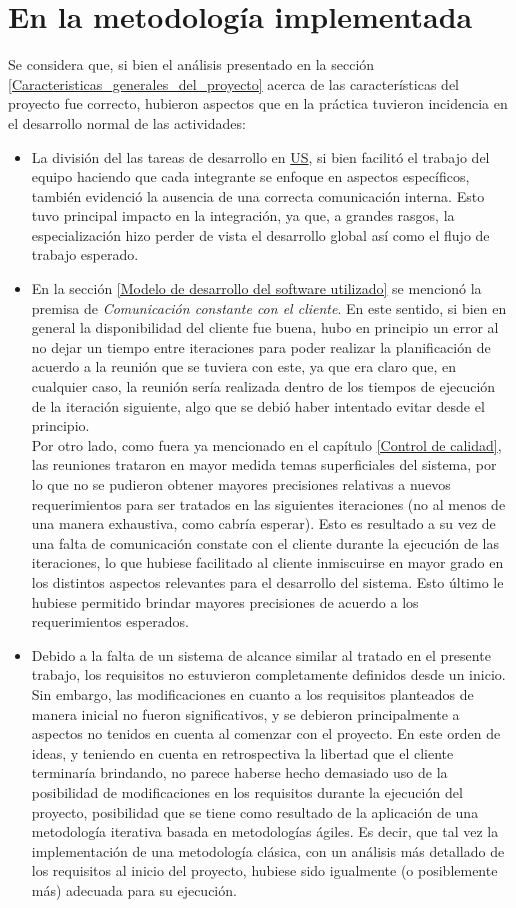 \documentclass[a4paper, 12pt,twoside]{report}  %
\numberwithin{equation}{subsection} %
\begin{document}
\section{En la metodología implementada}
\label{comparacion_metodologia_implementada}
Se considera que, si bien el análisis presentado en la sección \ref{Caracteristicas_generales_del_proyecto} acerca de las características del proyecto fue correcto, hubieron aspectos que en la práctica tuvieron incidencia en el desarrollo normal de las actividades:
\begin{itemize}
	\item La división del las tareas de desarrollo en \hyperlink{US}{US}, si bien facilitó el trabajo del equipo haciendo que cada integrante se enfoque en aspectos específicos, también evidenció la ausencia de una correcta comunicación interna. Esto tuvo principal impacto en la integración, ya que, a grandes rasgos, la especialización hizo perder de vista el desarrollo global así como el flujo de trabajo esperado.
	\item En la sección \ref{Modelo de desarrollo del software utilizado} se mencionó la premisa de \textit{Comunicación constante con el cliente}. En este sentido, si bien en general la disponibilidad del cliente fue buena, hubo en principio un error al no dejar un tiempo entre iteraciones para poder realizar la planificación de acuerdo a la reunión que se tuviera con este, ya que era claro que, en cualquier caso, la reunión sería realizada dentro de los tiempos de ejecución de la iteración siguiente, algo que se debió haber intentado evitar desde el principio.\\
	Por otro lado, como fuera ya mencionado en el capítulo \ref{Control de calidad}, las reuniones trataron en mayor medida temas superficiales del sistema, por lo que no se pudieron obtener mayores precisiones relativas a nuevos requerimientos para ser tratados en las siguientes iteraciones (no al menos de una manera exhaustiva, como cabría esperar). Esto es resultado a su vez de una falta de comunicación constate con el cliente durante la ejecución de las iteraciones, lo que hubiese facilitado al cliente inmiscuirse en mayor grado en los distintos aspectos relevantes para el desarrollo del sistema. Esto último le hubiese permitido brindar mayores precisiones de acuerdo a los requerimientos esperados.
	\item Debido a la falta de un sistema de alcance similar al tratado en el presente trabajo, los requisitos no estuvieron completamente definidos desde un inicio. Sin embargo, las modificaciones en cuanto a los requisitos planteados de manera inicial no fueron significativos, y se debieron principalmente a aspectos no tenidos en cuenta al comenzar con el proyecto. En este orden de ideas, y teniendo en cuenta en retrospectiva la libertad que el cliente terminaría brindando, no parece haberse hecho demasiado uso de la posibilidad de modificaciones en los requisitos durante la ejecución del proyecto, posibilidad que se tiene como resultado de la aplicación de una metodología iterativa basada en metodologías ágiles. Es decir, que tal vez la implementación de una metodología clásica, con un análisis más detallado de los requisitos al inicio del proyecto, hubiese sido igualmente (o posiblemente más) adecuada para su ejecución.

\end{itemize}
\end{document}
